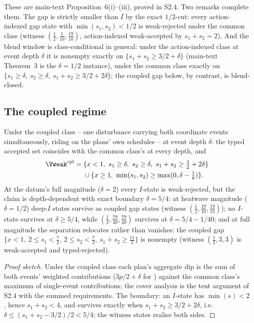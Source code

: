 These are main-text Proposition~6(i)--(iii), proved in S2.4. Two remarks complete them. The gap is strictly smaller than $I$ by the exact $1/2$-cut: every action-indexed gap state with $\min(s_1,s_2)<1/2$ is weak-rejected under the common class (witness $(\tfrac12,\tfrac1{10},\tfrac{19}{10})$, action-indexed weak-accepted by $s_1+s_2=2$). And the blend window is class-conditional in general: under the action-indexed class at event depth $\delta$ it is nonempty exactly on $\{s_1+s_2\ge3/2+\delta\}$ (main-text Theorem~3 is the $\delta=1/2$ instance), under the common class exactly on $\{s_1\ge\delta,\ s_2\ge\delta,\ s_1+s_2\ge3/2+2\delta\}$; the coupled gap below, by contrast, is blend-closed.

\subsection{The coupled regime}

\begin{theorem}\label{thm:coupled}
Under the coupled class -- one disturbance carrying both coordinate events simultaneously, riding on the plans' own schedules -- at event depth $\delta$: the typed accepted set coincides with the common class's at every depth, and
\begin{align*}
\Vweak^{\mathrm{cpl}}={}&\{x<1,\ s_1\ge\delta,\ s_2\ge\delta,\ s_1+s_2\ge\tfrac32+2\delta\}\\
&\cup\{x\ge1,\ \min(s_1,s_2)\ge\max(0,\delta-\tfrac18)\}.
\end{align*}
At the datum's full magnitude ($\delta=2$) every $I$-state is weak-rejected, but the claim is depth-dependent with exact boundary $\delta=5/4$: at heatwave magnitude ($\delta=1/2$) deep-$I$ states survive as coupled gap states (witness $(\tfrac12,\tfrac{19}{10},\tfrac{19}{10})$); no $I$-state survives at $\delta\ge5/4$, while $(\tfrac12,\tfrac{79}{40},\tfrac{79}{40})$ survives at $\delta=5/4-1/40$; and at full magnitude the separation relocates rather than vanishes: the coupled gap $\{x<1,\ 2\le s_1<\tfrac72,\ 2\le s_2<\tfrac72,\ s_1+s_2\ge\tfrac{11}2\}$ is nonempty (witness $(\tfrac12,3,3)$ is weak-accepted and typed-rejected).
\end{theorem}
\begin{proof}[Proof sketch]
Under the coupled class each plan's aggregate dip is the sum of both events' weighted contributions ($3p/2+\delta$ for ) against the common class's maximum of single-event contributions; the cover analysis is the tent argument of S2.4 with the summed requirements. The boundary: an $I$-state has $\min(s)<2$, hence $s_1+s_2<4$, and survives exactly when $s_1+s_2\ge3/2+2\delta$, i.e.\ $\delta\le(s_1+s_2-3/2)/2<5/4$; the witness states realise both sides.
\end{proof}

